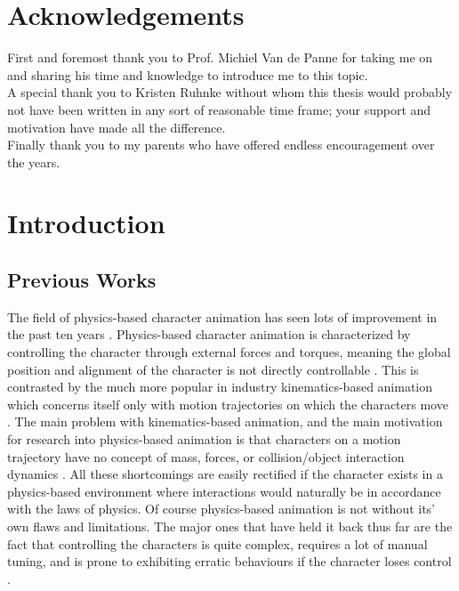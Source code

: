 \documentclass[12pt, a4paper]{article}
\begin{document}
\section*{Acknowledgements}
First and foremost thank you to Prof. Michiel Van de Panne for taking me on and sharing his time and knowledge to introduce me to this topic.\\

A special thank you to Kristen Ruhnke without whom this thesis would probably not have been written in any sort of reasonable time frame; your support and motivation have made all the difference.\\

Finally thank you to my parents who have offered endless encouragement over the years.
\newpage

\tableofcontents
\newpage
\listoffigures
\newpage
\listoftables

\newpage
\section{Introduction}

\subsection{Previous Works}

The field of physics-based character animation has seen lots of improvement in the past ten years \cite{Geijtenbeek, walking_survey}. Physics-based character animation is characterized by controlling the character through external forces and torques, meaning the global position and alignment of the character is not directly controllable \cite{Geijtenbeek}. This is contrasted by the much more popular in industry kinematics-based animation which concerns itself only with motion trajectories on which the characters move \cite{walking_survey}. The main problem with kinematics-based animation, and the main motivation for research into physics-based animation is that characters on a motion trajectory have no concept of mass, forces, or collision/object interaction dynamics \cite{walking_survey}. All these shortcomings are easily rectified if the character exists in a physics-based environment where interactions would naturally be in accordance with the laws of physics. Of course physics-based animation is not without its' own flaws and limitations. The major ones that have held it back thus far are the fact that controlling the characters is quite complex, requires a lot of manual tuning, and is prone to exhibiting erratic behaviours if the character loses control \cite{Geijtenbeek}. \\
\end{document}
